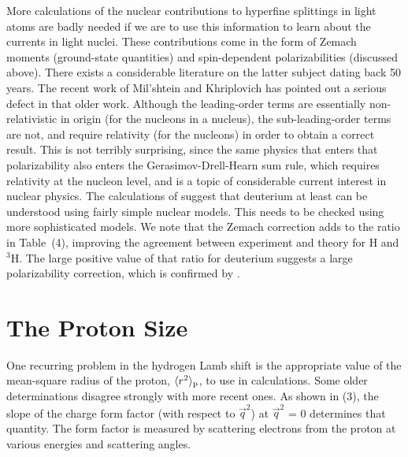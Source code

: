\documentclass{svmult}
\begin{document}
More calculations of the nuclear contributions to hyperfine splittings in light
atoms are badly needed if we are to use
this information to learn about the currents in light nuclei. These
contributions come in the form of Zemach
moments\cite{zemach} (ground-state
quantities) and spin-dependent
polarizabilities
(discussed above). There exists a considerable literature on the latter subject
dating back 50 years. The recent work of Mil'shtein and Khriplovich\cite{d-nu}
has pointed out a serious defect in that older work. Although the leading-order
terms are essentially non-relativistic in origin (for the nucleons in a 
nucleus), the sub-leading-order terms are not, and require relativity (for the 
nucleons) in order to obtain a correct result. This is not terribly surprising,
since the same physics that enters that polarizability also enters the
Gerasimov-Drell-Hearn sum rule\cite{GDH},
which requires relativity at the nucleon level\cite{GDH-nuc}, and is a topic of
considerable current interest in nuclear physics\cite{henry}. The calculations
of \cite{d-nu} suggest that deuterium at
least can be understood using fairly simple nuclear models. This needs to be
checked using more sophisticated models. We note that the Zemach
correction\cite{zemach} adds to the
ratio in Table~(4), improving the agreement between experiment and theory for H
and $^3$H. The large positive value of that ratio for deuterium suggests a large
polarizability correction, which is confirmed by \cite{d-nu}.

\section{The Proton Size}

One recurring problem in the hydrogen Lamb shift is the appropriate value of the
mean-square radius of the proton, $\langle r^2
\rangle_{\rm p}$, to use in calculations. Some older determinations\cite{HMW} 
disagree strongly with more recent ones\cite{Simon}. As shown in (3), the slope
of the charge form factor (with respect to $\vec{q}^2$) at $\vec{q}^2$ = 0
determines that quantity. The form factor is measured by scattering electrons
from the proton at various energies and scattering
angles.
\end{document}
